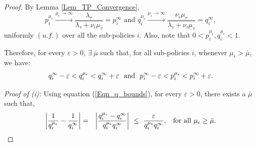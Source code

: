 \begin{proof}
	By Lemma  \ref{Lem_TP_Convergence}, 
	$$p_i^{\mu_\epsilon} \stackrel{\mu_\epsilon \to \infty}{\longrightarrow}  \frac{\lambda_\tau}{\lambda_\tau + \nu_i \mu_\tau} = p_i^{\infty} \mbox{ and  } q_i^{\mu_\epsilon} \stackrel{\mu_\epsilon \to \infty}{\longrightarrow} \frac{\nu_i \mu_\tau}{\lambda_\tau + \nu_i \mu_\tau} = q_i^\infty,$$ uniformly $(u.f.)$ over all the sub-policies $i$. Also, note that $0 < p_i^{\mu_\epsilon}, q_i^{\mu_\epsilon} <1$.
	
	Therefore, for every $\varepsilon >0, \ \exists \ \bar{\mu}$ such that, for all sub-policies $i$, whenever $\mu_\epsilon > \bar{\mu}$, we have:
	\begin{eqnarray}
	\label{Eqn_q_bounds}
	q_i^\infty - \varepsilon < q_i^{\mu_\epsilon} < q_i^\infty + \varepsilon \ \ \mbox{and} \ \ p_i^\infty - \varepsilon < p_i^{\mu_\epsilon} < p_i^\infty + \varepsilon.
	\end{eqnarray}
	
	
	{\it  Proof of (i):} 
	Using equation (\ref{Eqn_q_bounds}), for every $\varepsilon > 0$, there exists a $\bar{\mu}$ such that,
	\begin{eqnarray}
	\label{Eqn_fraction}
	\bigg| \frac{1}{q_i^{\mu_\epsilon}} - \frac{1}{q_i^\infty} \bigg| &= &\bigg| \frac{q_i^{\mu_\epsilon} - q_i^{\infty}}{q_i^{\mu_\epsilon} q_i^{\infty}}    \bigg|  \ \le \
	\frac{\varepsilon}{ q_i^{\mu_\epsilon} q_i^{\infty} }, \hspace{0.3cm} \mbox{for all} \  \mu_\epsilon \geq \bar{\mu}. 
	\end{eqnarray}
	

\end{proof}
